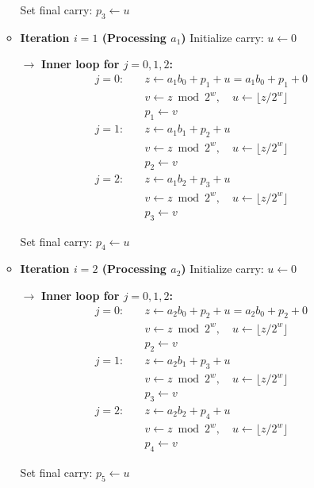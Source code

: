 \documentclass{article}
\begin{document}
\begin{enumerate}
\begin{itemize}
Set final carry: $p_3 \leftarrow u$

\item \textbf{Iteration $i = 1$ (Processing $a_1$)}
Initialize carry: $u \leftarrow 0$

$\rightarrow$ \textbf{Inner loop for $j = 0, 1, 2$:}
\begin{align*}
j = 0: \quad & z \leftarrow a_1 b_0 + p_1 + u = a_1 b_0 + p_1 + 0 \\
& v \leftarrow z \bmod 2^w, \quad u \leftarrow \lfloor z/2^w \rfloor \\
& p_1 \leftarrow v \\[0.5em]
j = 1: \quad & z \leftarrow a_1 b_1 + p_2 + u \\
& v \leftarrow z \bmod 2^w, \quad u \leftarrow \lfloor z/2^w \rfloor \\
& p_2 \leftarrow v \\[0.5em]
j = 2: \quad & z \leftarrow a_1 b_2 + p_3 + u \\
& v \leftarrow z \bmod 2^w, \quad u \leftarrow \lfloor z/2^w \rfloor \\
& p_3 \leftarrow v
\end{align*}

Set final carry: $p_4 \leftarrow u$

\item \textbf{Iteration $i = 2$ (Processing $a_2$)}
Initialize carry: $u \leftarrow 0$

$\rightarrow$ \textbf{Inner loop for $j = 0, 1, 2$:}
\begin{align*}
j = 0: \quad & z \leftarrow a_2 b_0 + p_2 + u = a_2 b_0 + p_2 + 0 \\
& v \leftarrow z \bmod 2^w, \quad u \leftarrow \lfloor z/2^w \rfloor \\
& p_2 \leftarrow v \\[0.5em]
j = 1: \quad & z \leftarrow a_2 b_1 + p_3 + u \\
& v \leftarrow z \bmod 2^w, \quad u \leftarrow \lfloor z/2^w \rfloor \\
& p_3 \leftarrow v \\[0.5em]
j = 2: \quad & z \leftarrow a_2 b_2 + p_4 + u \\
& v \leftarrow z \bmod 2^w, \quad u \leftarrow \lfloor z/2^w \rfloor \\
& p_4 \leftarrow v
\end{align*}

Set final carry: $p_5 \leftarrow u$

\end{itemize}



\end{enumerate}
\end{document}
